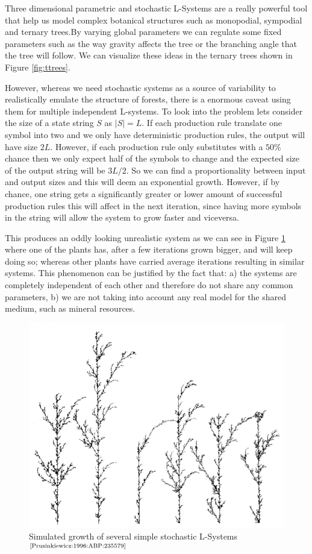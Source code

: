 \documentclass[letterpaper,twoside,11pt]{article}
\begin{document}
\begin{multicols}{2}
\label{sec:interdependence}

Three dimensional parametric and stochastic L-Systems are a really powerful tool that help us model complex botanical structures such as monopodial, sympodial and ternary trees.By varying global parameters we can regulate some fixed parameters such as the way gravity affects the tree or the branching angle that the tree will follow. We can visualize these ideas in the ternary trees shown in Figure \ref{fig:ttrees}.

However, whereas we need stochastic systems as a source of variability to realistically emulate the structure of forests, there is a enormous caveat using them for multiple independent L-systems. To look into the problem lets consider the size of a state string $S$ as $|S| = L$. If each production rule translate one symbol into two and we only have deterministic production rules, the output will have size $2L$. However, if each production rule only substitutes with a $50\%$ chance then we only expect half of the symbols to change and the expected size of the output string will be $3L/2$. So we can find a proportionality between input and output sizes and this will deem an exponential growth. However, if by chance, one string gets a significantly greater or lower amount of successful production rules this will affect in the next iteration, since having more symbols in the string will allow the system to grow faster and viceversa.

This produces an oddly looking unrealistic system as we can see in Figure \ref{fig:stochas} where one of the plants has, after a few iterations grown bigger, and will keep doing so; whereas other plants have carried average iterations resulting in similar systems. This phenomenon can be justified by the fact that: a) the systems are completely independent of each other and therefore do not share any common parameters, b) we are not taking into account any real model for the shared medium, such as mineral resources.

\begin{figure}[H]
    \includegraphics[width=.5\textwidth]{stochastic.png}
    \caption{Simulated growth of several simple stochastic L-Systems$^{\text{\cite{Prusinkiewicz:1996:ABP:235579}}}$}
    \label{fig:stochas}
\end{figure}


\end{multicols}
\end{document}
